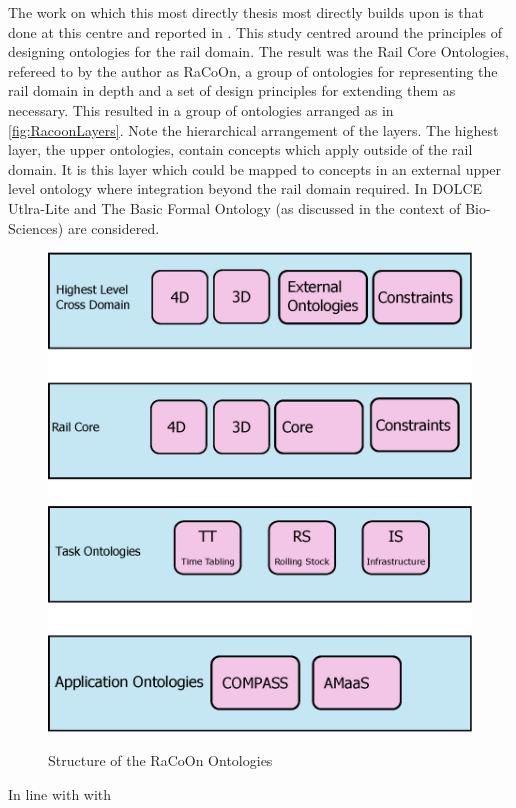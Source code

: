 The work on which this most directly thesis most directly builds upon is that done at this centre and reported in \cite{Tutcher2015}. This study centred around the principles of designing ontologies for the rail domain. The result was the Rail Core Ontologies, refereed to by the author as RaCoOn, a group of ontologies for representing the rail domain in depth and a set of design principles for extending them as necessary. This resulted in a group of ontologies arranged as in \autoref{fig:RacoonLayers}. Note the hierarchical arrangement of the layers. The highest layer, the upper ontologies, contain concepts which apply outside of the rail domain. It is this layer which could be mapped to concepts in an external upper level ontology where integration beyond the rail domain required. In \cite{Tutcher2015} DOLCE Utlra-Lite and The Basic Formal Ontology (as discussed in the context of Bio-Sciences) are considered.

\begin{figure}[htb]
\myfloatalign
{\includegraphics[width=0.6\linewidth,keepaspectratio]{gfx/RacoonLayers}} 
\caption[Racoon Layers]{Structure of the RaCoOn Ontologies}
\label{fig:RacoonLayers}
\end{figure}

In line with with



